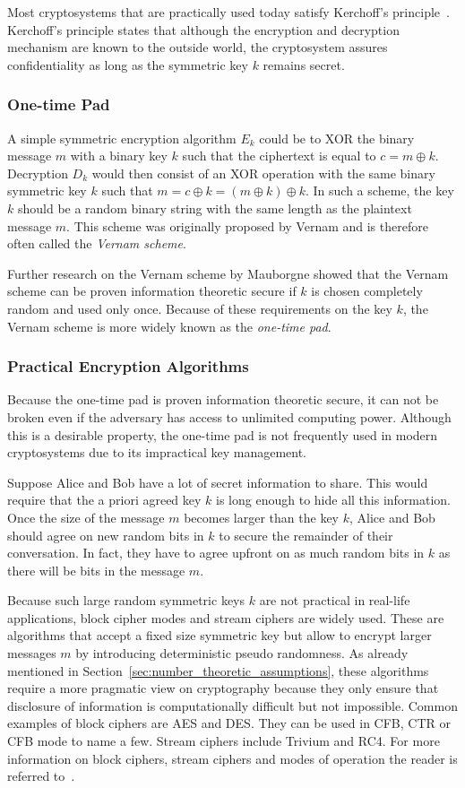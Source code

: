 Most cryptosystems that are practically used today satisfy Kerchoff's principle~\cite{art:Kerckhoffs1883}. Kerchoff's principle states that although the encryption and decryption mechanism are known to the outside world, the cryptosystem assures confidentiality as long as the symmetric key $k$ remains secret.

\subsubsection{One-time Pad}
A simple symmetric encryption algorithm $E_k$ could be to XOR the binary message $m$ with a binary key $k$ such that the ciphertext is equal to $c = m \oplus k$. Decryption $D_k$ would then consist of an XOR operation with the same binary symmetric key $k$ such that $m = c \oplus k = \left( m \oplus k \right) \oplus k$.  In such a scheme, the key $k$ should be a random binary string with the same length as the plaintext message $m$. This scheme was originally proposed by Vernam and is therefore often called the \textit{Vernam scheme}.

Further research on the Vernam scheme by Mauborgne showed that the Vernam scheme can be proven information theoretic secure if $k$ is chosen completely random and used only once. Because of these requirements on the key $k$, the Vernam scheme is more widely known as the \textit{one-time pad}.

\subsubsection{Practical Encryption Algorithms}
Because the one-time pad is proven information theoretic secure, it can not be broken even if the adversary has access to unlimited computing power. Although this is a desirable property, the one-time pad is not frequently used in modern cryptosystems due to its impractical key management.

Suppose Alice and Bob have a lot of secret information to share. This would require that the a priori agreed key $k$ is long enough to hide all this information. Once the size of the message $m$ becomes larger than the key $k$, Alice and Bob should agree on new random bits in $k$ to secure the remainder of their conversation. In fact, they have to agree upfront on as much random bits in $k$ as there will be bits in the message $m$.

Because such large random symmetric keys $k$ are not practical in real-life applications, block cipher modes and stream ciphers are widely used. These are algorithms that accept a fixed size symmetric key but allow to encrypt larger messages $m$ by introducing deterministic pseudo randomness. As already mentioned in Section~\ref{sec:number_theoretic_assumptions}, these algorithms require a more pragmatic view on cryptography because they only ensure that disclosure of information is computationally difficult but not impossible. Common examples of block ciphers are AES and DES. They can be used in CFB, CTR or CFB mode to name a few. Stream ciphers include Trivium and RC4. For more information on block ciphers, stream ciphers and modes of operation the reader is referred to~\cite{book:handbook_of_applied_cryptography}.


